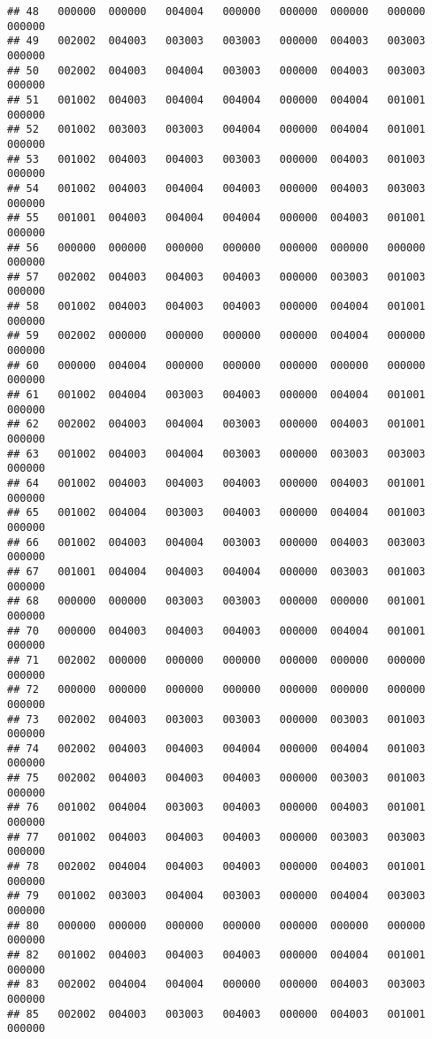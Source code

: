 \documentclass[
]{article}
\begin{document}
\begin{verbatim}
## 48   000000  000000   004004   000000   000000  000000   000000   000000
## 49   002002  004003   003003   003003   000000  004003   003003   000000
## 50   002002  004003   004004   003003   000000  004003   003003   000000
## 51   001002  004003   004004   004004   000000  004004   001001   000000
## 52   001002  003003   003003   004004   000000  004004   001001   000000
## 53   001002  004003   004003   003003   000000  004003   001003   000000
## 54   001002  004003   004004   004003   000000  004003   003003   000000
## 55   001001  004003   004004   004004   000000  004003   001001   000000
## 56   000000  000000   000000   000000   000000  000000   000000   000000
## 57   002002  004003   004003   004003   000000  003003   001003   000000
## 58   001002  004003   004003   004003   000000  004004   001001   000000
## 59   002002  000000   000000   000000   000000  004004   000000   000000
## 60   000000  004004   000000   000000   000000  000000   000000   000000
## 61   001002  004004   003003   004003   000000  004004   001001   000000
## 62   002002  004003   004004   003003   000000  004003   001001   000000
## 63   001002  004003   004004   003003   000000  003003   003003   000000
## 64   001002  004003   004003   004003   000000  004003   001001   000000
## 65   001002  004004   003003   004003   000000  004004   001003   000000
## 66   001002  004003   004004   003003   000000  004003   003003   000000
## 67   001001  004004   004003   004004   000000  003003   001003   000000
## 68   000000  000000   003003   003003   000000  000000   001001   000000
## 70   000000  004003   004003   004003   000000  004004   001001   000000
## 71   002002  000000   000000   000000   000000  000000   000000   000000
## 72   000000  000000   000000   000000   000000  000000   000000   000000
## 73   002002  004003   003003   003003   000000  003003   001003   000000
## 74   002002  004003   004003   004004   000000  004004   001003   000000
## 75   002002  004003   004003   004003   000000  003003   001003   000000
## 76   001002  004004   003003   004003   000000  004003   001001   000000
## 77   001002  004003   004003   004003   000000  003003   003003   000000
## 78   002002  004004   004003   004003   000000  004003   001001   000000
## 79   001002  003003   004004   003003   000000  004004   003003   000000
## 80   000000  000000   000000   000000   000000  000000   000000   000000
## 82   001002  004003   004003   004003   000000  004004   001001   000000
## 83   002002  004004   004004   000000   000000  004003   003003   000000
## 85   002002  004003   003003   004003   000000  004003   001001   000000

\end{verbatim}
\end{document}
